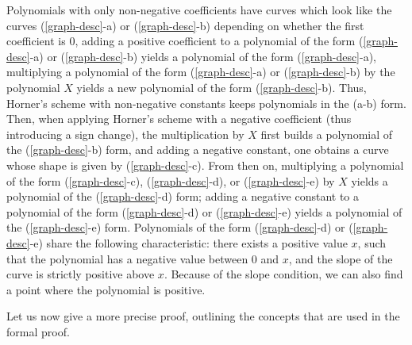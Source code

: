 \documentclass{mscs}
\begin{document}
Polynomials with only non-negative coefficients have curves which look
like the curves (\ref{graph-desc}-a) or (\ref{graph-desc}-b) depending on whether the first
coefficient is 0, adding a positive coefficient to a polynomial of the
form (\ref{graph-desc}-a) or (\ref{graph-desc}-b) yields a polynomial of the form (\ref{graph-desc}-a), multiplying a
polynomial of the form (\ref{graph-desc}-a) or (\ref{graph-desc}-b) by the polynomial \(X\) yields a new
polynomial of the form (\ref{graph-desc}-b).  Thus, Horner's scheme with non-negative
constants keeps polynomials in the (a-b) form.  Then, when applying
Horner's scheme with a negative coefficient (thus introducing a sign
change), the multiplication by \(X\) first builds a polynomial of the
(\ref{graph-desc}-b) form, and adding a negative constant, one obtains a curve whose
shape is given by (\ref{graph-desc}-c).  From then on, multiplying a polynomial of the
form (\ref{graph-desc}-c), (\ref{graph-desc}-d), or (\ref{graph-desc}-e) by \(X\) yields a polynomial of the (\ref{graph-desc}-d) form; adding a
negative constant to a polynomial of the form (\ref{graph-desc}-d) or (\ref{graph-desc}-e) yields a
polynomial of the (\ref{graph-desc}-e) form.  Polynomials of the form (\ref{graph-desc}-d) or (\ref{graph-desc}-e)
share the following characteristic: there exists a positive value
\(x\), such that the polynomial has a negative value between 0 and
\(x\), and the slope of the curve is strictly positive above
\(x\).  Because of the slope condition, we can also find a point where
the polynomial is positive.

Let us now give a more precise proof, outlining the concepts that are
used in the formal proof.
\end{document}
